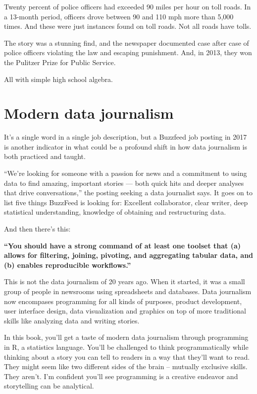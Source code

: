 \documentclass[]{book}
\begin{document}
Twenty percent of police officers had exceeded 90 miles per hour on toll roads. In a 13-month period, officers drove between 90 and 110 mph more than 5,000 times. And these were just instances found on toll roads. Not all roads have tolls.

The story was a stunning find, and the newspaper documented case after case of police officers violating the law and escaping punishment. And, in 2013, they won the Pulitzer Prize for Public Service.

All with simple high school algebra.

\hypertarget{modern-data-journalism}{%
\section{Modern data journalism}\label{modern-data-journalism}}

It's a single word in a single job description, but a Buzzfeed job posting in 2017 is another indicator in what could be a profound shift in how data journalism is both practiced and taught.

``We're looking for someone with a passion for news and a commitment to using data to find amazing, important stories --- both quick hits and deeper analyses that drive conversations,'' the posting seeking a data journalist says. It goes on to list five things BuzzFeed is looking for: Excellent collaborator, clear writer, deep statistical understanding, knowledge of obtaining and restructuring data.

And then there's this:

\textbf{``You should have a strong command of at least one toolset that (a) allows for filtering, joining, pivoting, and aggregating tabular data, and (b) enables reproducible workflows.''}

This is not the data journalism of 20 years ago. When it started, it was a small group of people in newsrooms using spreadsheets and databases. Data journalism now encompases programming for all kinds of purposes, product development, user interface design, data visualization and graphics on top of more traditional skills like analyzing data and writing stories.

In this book, you'll get a taste of modern data journalism through programming in R, a statistics language. You'll be challenged to think programmatically while thinking about a story you can tell to readers in a way that they'll want to read. They might seem like two different sides of the brain -- mutually exclusive skills. They aren't. I'm confident you'll see programming is a creative endeavor and storytelling can be analytical.
\end{document}
